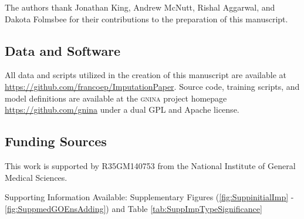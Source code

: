 \documentclass[journal=jcim,manuscript=article]{achemso}
\begin{document}
\begin{acknowledgement}

The authors thank Jonathan King, Andrew McNutt, Rishal Aggarwal, and Dakota Folmsbee for their contributions to the preparation of this manuscript.

\subsection{Data and Software}
All data and scripts utilized in the creation of this manuscript are available at \url{https://github.com/francoep/ImputationPaper}.
Source code, training scripts, and model definitions are available at the \textsc{gnina} project homepage \url{https://github.com/gnina} under a dual GPL and Apache license.

\subsection{Funding Sources}
This work is supported by R35GM140753 from the National Institute of General Medical Sciences.

\end{acknowledgement}

\begin{suppinfo}

Supporting Information Available: Supplementary Figures (\ref{fig:SuppinitialImp} - \ref{fig:SuppmedGOEnsAdding}) and Table \ref{tab:SuppImpTypeSignificance}
\end{suppinfo}


\end{document}
